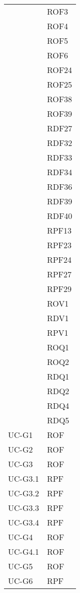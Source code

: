 \begin{longtable}{| p{5cm} | p{5cm} |}
		\rowcolor{LightGray}
		\multirow[t]{23}{*}{\cellcolor{LightGray}}{Capitolato} 
				 & ROF3 \\
				\rowcolor{LightGray} &	ROF4 \\
				\rowcolor{LightGray} &	ROF5 \\
				\rowcolor{LightGray} &	ROF6 \\
				\rowcolor{LightGray} &	ROF24 \\
				\rowcolor{LightGray} &	ROF25 \\
				\rowcolor{LightGray} &	ROF38 \\
				\rowcolor{LightGray} &	ROF39 \\
				\rowcolor{LightGray} &	RDF27 \\
				\rowcolor{LightGray} &	RDF32 \\
				\rowcolor{LightGray} &	RDF33 \\
				\rowcolor{LightGray} &	RDF34 \\
				\rowcolor{LightGray} &	RDF36 \\
				\rowcolor{LightGray} &	RDF39 \\
				\rowcolor{LightGray} &	RDF40 \\
				\rowcolor{LightGray} &	RPF13 \\
				\rowcolor{LightGray} &	RPF23 \\
				\rowcolor{LightGray} &	RPF24 \\
				\rowcolor{LightGray} &	RPF27 \\
				\rowcolor{LightGray} &	RPF29 \\
				\rowcolor{LightGray} &	ROV1 \\
				\rowcolor{LightGray} &	RDV1 \\
				\rowcolor{LightGray} &	RPV1 \\
				\rowcolor{LightGray} &	ROQ1 \\
				\rowcolor{LightGray} &	ROQ2 \\
				\rowcolor{LightGray} &	RDQ1 \\
				\rowcolor{LightGray} &	RDQ2 \\
				\rowcolor{LightGray} &	RDQ4 \\
				\rowcolor{LightGray} &	RDQ5 \\
		UC-G1 & ROF\\
		UC-G2 & ROF\\
		\rowcolor{LightGray}
		UC-G3 & ROF \\
		\rowcolor{LightGray}
		UC-G3.1 & RPF \\
		\rowcolor{LightGray}
		UC-G3.2 & RPF \\
		UC-G3.3 & RPF \\
		UC-G3.4 & RPF \\
		UC-G4 & ROF \\
		\rowcolor{LightGray}
		UC-G4.1 & ROF \\
		UC-G5 & ROF \\
		UC-G6 & RPF\\
		

\end{longtable}
